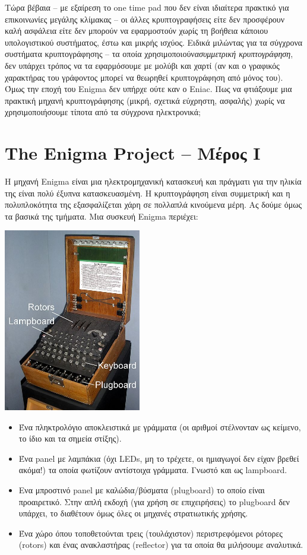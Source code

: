 \documentclass[a4paper,twoside,12pt]{article}
\begin{document}
Τώρα βέβαια – με εξαίρεση το one time pad που δεν είναι ιδιαίτερα πρακτικό για επικοινωνίες μεγάλης κλίμακας – οι άλλες κρυπτογραφήσεις  είτε δεν προσφέρουν καλή ασφάλεια είτε δεν μπορούν να εφαρμοστούν χωρίς τη βοήθεια κάποιου υπολογιστικού συστήματος, έστω και μικρής ισχύος. Ειδικά μιλώντας για τα σύγχρονα συστήματα κρυπτογράφησης – τα οποία χρησιμοποιούν\emph{ασυμμετρική κρυπτογράφηση}, δεν υπάρχει τρόπος να τα εφαρμόσουμε με μολύβι και χαρτί (αν και ο γραφικός χαρακτήρας του γράφοντος μπορεί να θεωρηθεί κρυπτογράφηση από μόνος του). Όμως την εποχή του Enigma δεν υπήρχε ούτε καν ο Eniac. Πως να φτιάξουμε μια πρακτική μηχανή κρυπτογράφησης (μικρή, σχετικά εύχρηστη, ασφαλής) χωρίς να χρησιμοποιήσουμε τίποτα από τα σύγχρονα ηλεκτρονικά;
%
\section{The Enigma Project -- Μέρος I}
%
Η μηχανή Enigma είναι μια ηλεκτρομηχανική κατασκευή και πράγματι για την ηλικία της είναι πολύ έξυπνα κατασκευασμένη. Η κρυπτογράφηση είναι συμμετρική και η πολυπλοκότητα της εξασφαλίζεται χάρη σε πολλαπλά κινούμενα μέρη.
Ας δούμε όμως τα βασικά της τμήματα. Μια συσκευή Enigma περιέχει:
%
\begin{center}
  \includegraphics[width=0.45\textwidth]{images/main/enigma}
\end{center}
%
\begin{itemize}
\item Ένα πληκτρολόγιο αποκλειστικά με γράμματα (οι αριθμοί στέλνονταν ως κείμενο, το ίδιο και τα σημεία στίξης).
\item Ένα panel με λαμπάκια (όχι LEDs, μη το τρέχετε, οι ημιαγωγοί δεν είχαν βρεθεί ακόμα!) τα οποία φωτίζουν αντίστοιχα γράμματα. Γνωστό και ως lampboard.
\item Ενα μπροστινό panel με καλώδια/βύσματα (plugboard) το οποίο είναι προαιρετικό. Στην απλή εκδοχή (για χρήση σε επιχειρήσεις) το plugboard δεν υπάρχει, το διαθέτουν όμως όλες οι μηχανές στρατιωτικής χρήσης.
\item Ένα χώρο όπου τοποθετούνται τρεις (τουλάχιστον) περιστρεφόμενοι ρότορες (rotors) και ένας ανακλαστήρας (reflector) για τα οποία θα μιλήσουμε αναλυτικά.
\end{itemize}
\end{document}
